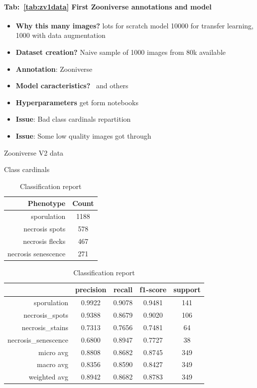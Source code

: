 \documentclass[english]{article}
\begin{document}
\paragraph{Tab:~\ref{tab:zv1data} First Zooniverse annotations and model}
\begin{itemize}
	\item \textbf{Why this many images?} lots for scratch model 10000 for transfer learning, 1000 with data augmentation
	\item \textbf{Dataset creation?} Naive sample of 1000 images from 80k available
	\item \textbf{Annotation}: Zooniverse
	\item \textbf{Model caracteristics?}~\parencite{dosovitskiyImageWorth16x162021} and others
	\item \textbf{Hyperparameters} get form notebooks
	\item \textbf{Issue}: Bad class cardinals repartition
	\item \textbf{Issue}: Some low quality images got through
\end{itemize}

\begin{table}[H]
	\caption{Zooniverse V2 data}\label{tab:zv2data}
	\begin{minipage}{0.4\linewidth}
		\centering
		\caption{Class cardinals}\label{tab:zoonv2classcardinals}
		\begin{tabular}{rc}
			\toprule
			Phenotype           & Count \\
			\midrule
			sporulation         & 1188  \\
			necrosis spots      & 578   \\
			necrosis flecks     & 467   \\
			necrosis senescence & 271   \\
			\bottomrule
		\end{tabular}
	\end{minipage}%
	\begin{minipage}{0.4\linewidth}
		\centering
		\caption{Classification report}\label{tab:zv2mcr}
		\begin{tabular}{rcccc}
			\toprule
			{}                   & precision & recall & f1-score & support \\
			\midrule
			sporulation          & 0.9922    & 0.9078 & 0.9481   & 141     \\
			necrosis\_spots      & 0.9388    & 0.8679 & 0.9020   & 106     \\
			necrosis\_stains     & 0.7313    & 0.7656 & 0.7481   & 64      \\
			necrosis\_senescence & 0.6800    & 0.8947 & 0.7727   & 38      \\
			micro avg            & 0.8808    & 0.8682 & 0.8745   & 349     \\
			macro avg            & 0.8356    & 0.8590 & 0.8427   & 349     \\
			weighted avg         & 0.8942    & 0.8682 & 0.8783   & 349     \\
			\bottomrule
		\end{tabular}
	\end{minipage}
\end{table}
\end{document}
